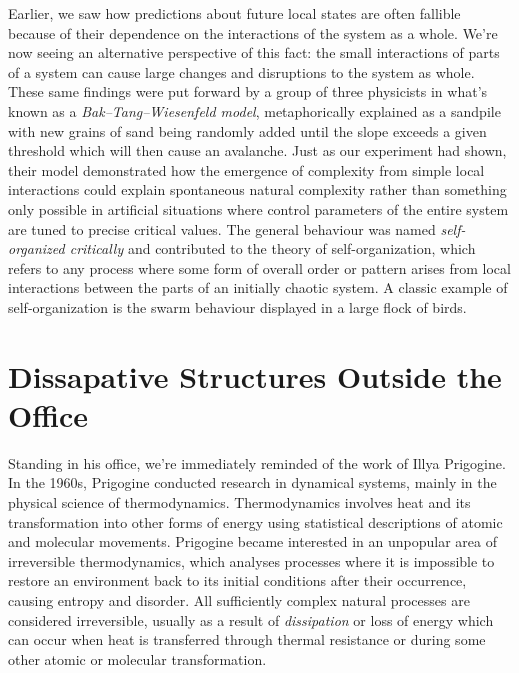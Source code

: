 \documentclass{article}
\begin{document}
Earlier, we saw how predictions about future local states are often fallible because of their dependence on the interactions of the system as a whole. We're now seeing an alternative perspective of this fact: the small interactions of parts of a system can cause large changes and disruptions to the system as whole. These same findings were put forward by a group of three physicists in what's known as a \emph{Bak–Tang–Wiesenfeld model}\cite{btw}, metaphorically explained as a sandpile with new grains of sand being randomly added until the slope exceeds a given threshold which will then cause an avalanche. Just as our experiment had shown, their model demonstrated how the emergence of complexity from simple local interactions could explain spontaneous natural complexity rather than something only possible in artificial situations where control parameters of the entire system are tuned to precise critical values. The general behaviour was named \emph{self-organized critically} and contributed to the theory of self-organization, which refers to any process where some form of overall order or pattern arises from local interactions between the parts of an initially chaotic system. A classic example of self-organization is the swarm behaviour displayed in a large flock of birds.

\section{Dissapative Structures Outside the Office}
Standing in his office, we're immediately reminded of the work of Illya Prigogine. In the 1960s, Prigogine conducted research in dynamical systems, mainly in the physical science of thermodynamics. Thermodynamics involves heat and its transformation into other forms of energy using statistical descriptions of atomic and molecular movements. Prigogine became interested in an unpopular area of irreversible thermodynamics, which analyses processes where it is impossible to restore an environment back to its initial conditions after their occurrence, causing entropy and disorder. All sufficiently complex natural processes are considered irreversible, usually as a result of \emph{dissipation} or loss of energy which can occur when heat is transferred through thermal resistance or during some other atomic or molecular transformation.
\end{document}
